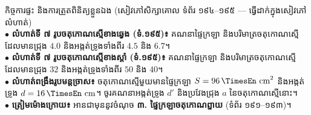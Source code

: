 \documentclass[a4paper,10pt]{article}
\newcommand{\en}[1]{{\TimesEn #1}}
\newcommand{\unit}[1]{\,\text{\en{#1}}}
\begin{document}
\vspace{6pt}
\begin{tcolorbox}[
  enhanced, sharp corners, colback=panelgray, colframe=black,
  boxrule=1.0pt, boxsep=2.5pt, top=5pt, bottom=5pt, left=6pt, right=6pt
]
  {\muol\fontsize{9.0pt}{13.5pt}\selectfont កិច្ចការផ្ទះ និងការត្រួតពិនិត្យខ្លួនឯង (សៀវភៅសិក្សាគោល ទំព័រ ១៩៤--១៩៥ — ធ្វើដាក់ក្នុងសៀវភៅលំហាត់)}\\[3pt]
  $\bullet$ \textbf{លំហាត់ទី ៧ រូបចតុកោណស្មើខាងឆ្វេង (ទំ.១៩៥)៖} គណនាផ្ទៃក្រឡា និងបរិមាត្រចតុកោណស្មើដែលមានជ្រុង $4.0$ និងអង្កត់ទ្រូងទាំងពីរ $4.5$ និង $6.7$។\\[2pt]
  $\bullet$ \textbf{លំហាត់ទី ៧ រូបចតុកោណស្មើខាងស្ដាំ (ទំ.១៩៥)៖} គណនាផ្ទៃក្រឡា និងបរិមាត្រចតុកោណស្មើដែលមានជ្រុង $32$ និងអង្កត់ទ្រូងទាំងពីរ $50$ និង $40$។\\[2pt]
  $\bullet$ \textbf{លំហាត់ពង្រឹងរូបមន្តច្រាស៖} ចតុកោណស្មើមួយមានផ្ទៃក្រឡា $S = 96\unit{cm}^2$ និងអង្កត់ទ្រូង $d = 16\unit{cm}$។ ចូរគណនាអង្កត់ទ្រូង $d'$ និងប្រវែងជ្រុង $a$ នៃចតុកោណស្មើនោះ។\\[2pt]
  $\bullet$ \textbf{ត្រៀមម៉ោងក្រោយ៖} អានជាមុននូវចំណុច \textbf{៣. ផ្ទៃក្រឡាចតុកោណព្នាយ} (ទំព័រ ១៩១--១៩៣)។
\end{tcolorbox}
\end{document}
